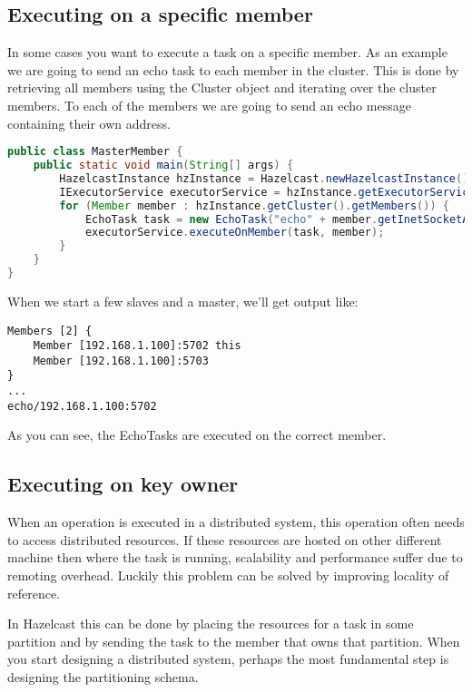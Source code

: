 \subsection{Executing on a specific member}
In some cases you want to execute a task on a specific member. As an example we are going to send an echo task to each member in the cluster. This is done by retrieving all members using the Cluster object and iterating over the cluster members. To each of the members we are going to send an echo message containing their own address. 
\begin{lstlisting}[language=java]
public class MasterMember {
    public static void main(String[] args) {
        HazelcastInstance hzInstance = Hazelcast.newHazelcastInstance();
        IExecutorService executorService = hzInstance.getExecutorService("executor");
        for (Member member : hzInstance.getCluster().getMembers()) {
            EchoTask task = new EchoTask("echo" + member.getInetSocketAddress());
            executorService.executeOnMember(task, member);
        }
    }
}
\end{lstlisting}
When we start a few slaves and a master, we'll get output like:
\begin{lstlisting}
Members [2] {
	Member [192.168.1.100]:5702 this
	Member [192.168.1.100]:5703
}
...
echo/192.168.1.100:5702
\end{lstlisting}
As you can see, the EchoTasks are executed on the correct member.

\subsection{Executing on key owner}
When an operation is executed in a distributed system, this operation often needs to access distributed resources. If these resources are hosted on other different machine then where the task is running, scalability and performance suffer due to remoting overhead. Luckily this problem can be solved by improving locality of reference.

In Hazelcast this can be done by placing the resources for a task in some partition and by sending the task to the member that owns that partition. When you start designing a distributed system, perhaps the most fundamental step is designing the partitioning schema.

